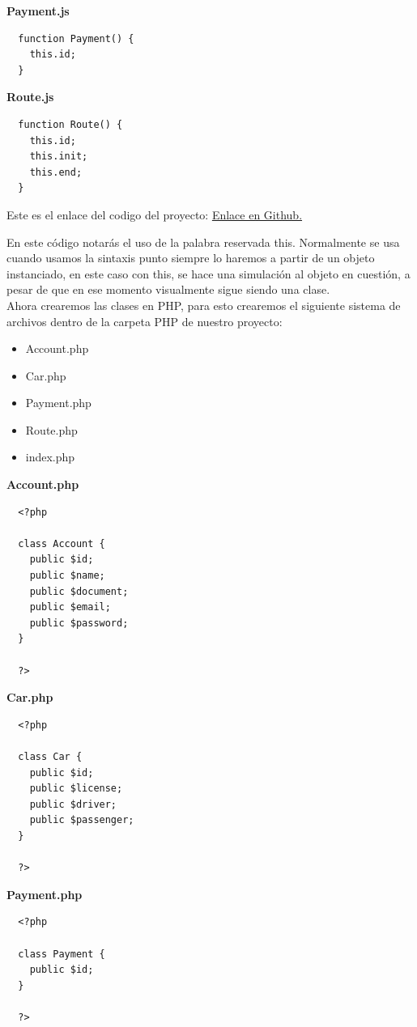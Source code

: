 \documentclass{article}
\begin{document}
\textbf{Payment.js}
\begin{verbatim}
  function Payment() {
    this.id;
  }
\end{verbatim}

\textbf{Route.js}
\begin{verbatim}
  function Route() {
    this.id;
    this.init;
    this.end;
  }
\end{verbatim}

Este es el enlace del codigo del proyecto:
\href{https://github.com/anncode1/Curso-POO-Platzi/tree/f5725787165b36cae579f94e428068039b554b0b/JS}{Enlace en Github.}

En este código notarás el uso de la palabra reservada this. Normalmente se usa
cuando usamos la sintaxis punto siempre lo haremos a partir de un objeto
instanciado, en este caso con this, se hace una simulación al objeto en
cuestión, a pesar de que en ese momento visualmente sigue siendo una clase.\\

Ahora crearemos las clases en PHP, para esto crearemos el siguiente sistema de
archivos dentro de la carpeta PHP de nuestro proyecto:

\begin{itemize}
  \item Account.php
  \item Car.php
  \item Payment.php
  \item Route.php
  \item index.php
\end{itemize}

\newpage
\textbf{Account.php}
\begin{verbatim}
  <?php

  class Account {
    public $id;
    public $name;
    public $document;
    public $email;
    public $password;
  }

  ?>
\end{verbatim}

\textbf{Car.php}
\begin{verbatim}
  <?php

  class Car {
    public $id;
    public $license;
    public $driver;
    public $passenger;
  }

  ?>
\end{verbatim}

\textbf{Payment.php}
\begin{verbatim}
  <?php

  class Payment {
    public $id;
  }

  ?>
\end{verbatim}
\end{document}
